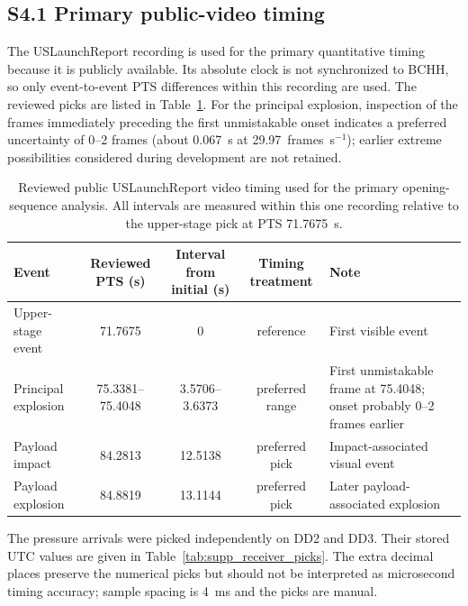 \documentclass[]{seismica}
\begin{document}
\subsection*{S4.1 Primary public-video timing}

The USLaunchReport recording is used for the primary quantitative timing
because it is publicly available. Its absolute clock is not synchronized to
BCHH, so only event-to-event PTS differences within this recording are used.
The reviewed picks are listed in Table~\ref{tab:supp_public_video_pts}. For
the principal explosion, inspection of the frames immediately preceding the
first unmistakable onset indicates a preferred uncertainty of 0--2 frames
(about 0.067~s at 29.97~frames~s$^{-1}$); earlier extreme possibilities
considered during development are not retained.

\begin{table}[!tbp]
\centering
\caption{Reviewed public USLaunchReport video timing used for the primary
opening-sequence analysis. All intervals are measured within this one recording
relative to the upper-stage pick at PTS 71.7675~s.}
\label{tab:supp_public_video_pts}
\begin{tabularx}{\textwidth}{XcccX}
\hline
Event & Reviewed PTS (s) & Interval from initial (s) & Timing treatment & Note \\
\hline
Upper-stage event & 71.7675 & 0 & reference & First visible event \\
Principal explosion & 75.3381--75.4048 & 3.5706--3.6373 & preferred range & First unmistakable frame at 75.4048; onset probably 0--2 frames earlier \\
Payload impact & 84.2813 & 12.5138 & preferred pick & Impact-associated visual event \\
Payload explosion & 84.8819 & 13.1144 & preferred pick & Later payload-associated explosion \\
\hline
\end{tabularx}
\end{table}

The pressure arrivals were picked independently on DD2 and DD3. Their stored
UTC values are given in Table~\ref{tab:supp_receiver_picks}. The extra decimal
places preserve the numerical picks but should not be interpreted as
microsecond timing accuracy; sample spacing is 4~ms and the picks are manual.
\end{document}

